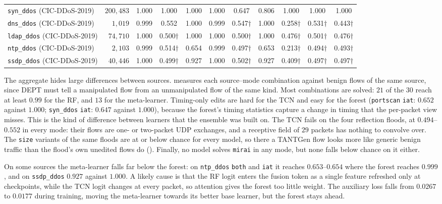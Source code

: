 \documentclass[acmtog,nonacm,pbalance]{acmart}
\newcommand{\src}[1]{\texttt{#1}}
\newcommand{\dmode}[1]{\texttt{#1}}
\begin{document}
\begin{table}[t]
\begin{tabular}{@{}lr ccc ccc ccc@{}}
    \src{syn\_ddos} (CIC-DDoS-2019) & $200{,}483$ & 1.000 & 1.000 & 1.000 & 1.000 & 0.647 & 0.806 & 1.000 & 1.000 & 1.000 \\
    \src{dns\_ddos} (CIC-DDoS-2019) & $1{,}019$ & 0.999 & 0.552 & 1.000 & 0.999 & 0.547$\dagger$ & 1.000 & 0.258$\dagger$ & 0.531$\dagger$ & 0.443$\dagger$ \\
    \src{ldap\_ddos} (CIC-DDoS-2019) & $74{,}710$ & 1.000 & 0.500$\dagger$ & 1.000 & 1.000 & 0.500$\dagger$ & 1.000 & 0.476$\dagger$ & 0.501$\dagger$ & 0.476$\dagger$ \\
    \src{ntp\_ddos} (CIC-DDoS-2019) & $2{,}103$ & 0.999 & 0.514$\dagger$ & 0.654 & 0.999 & 0.497$\dagger$ & 0.653 & 0.213$\dagger$ & 0.494$\dagger$ & 0.493$\dagger$ \\
    \src{ssdp\_ddos} (CIC-DDoS-2019) & $40{,}446$ & 1.000 & 0.499$\dagger$ & 0.927 & 1.000 & 0.502$\dagger$ & 0.927 & 0.409$\dagger$ & 0.497$\dagger$ & 0.497$\dagger$ \\
    \bottomrule
  \end{tabular}
\end{table}

The aggregate hides large differences between sources. 
measures each source--mode combination against benign flows of the same
source, since DEPT must tell a manipulated flow from an unmanipulated flow of the
same kind. Most combinations are solved: $21$ of the $30$ reach at least $0.99$
for the RF, and $13$ for the meta-learner. Timing-only edits are hard for the
TCN and easy for the forest (\src{portscan} \dmode{iat}: $0.652$ against
$1.000$; \src{syn\_ddos} \dmode{iat}: $0.647$ against $1.000$), because the
forest's timing statistics capture a change in timing that the per-packet view
misses. This is the kind of difference between learners that the ensemble was
built on. The TCN fails on the four reflection floods, at $0.494$--$0.552$ in
every mode: their flows are one- or two-packet UDP exchanges, and a receptive
field of $29$ packets has nothing to convolve over. The \dmode{size} variants of
the same floods are at or below chance for every model, so there a TANTGen flow
looks more like generic benign traffic than the flood's own unedited flows do
(). Finally, no model solves \src{mirai} in any mode, but
none falls below chance on it either.

On some sources the meta-learner falls far below the forest: on
\src{ntp\_ddos} \dmode{both} and \dmode{iat} it reaches $0.653$--$0.654$ where
the forest reaches $0.999$, and on \src{ssdp\_ddos} $0.927$ against $1.000$. A
likely cause is that the RF logit enters the fusion token as a single feature
refreshed only at checkpoints, while the TCN logit changes at every packet, so
attention gives the forest too little weight. The auxiliary loss falls from
$0.0267$ to $0.0177$ during training, moving the meta-learner towards its better
base learner, but the forest stays ahead.
\end{document}
